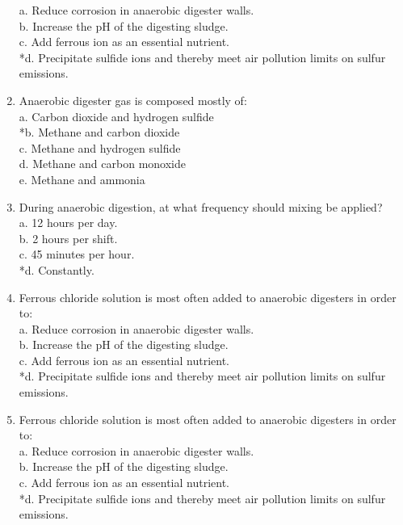\documentclass{article}
\begin{document}
\begin{enumerate}
a. Reduce corrosion in anaerobic digester walls. \\
b. Increase the pH of the digesting sludge. \\
c. Add ferrous ion as an essential nutrient. \\
*d. Precipitate sulfide ions and thereby meet air pollution limits on sulfur emissions. \\

\item  Anaerobic digester gas is composed mostly of: \\

a. Carbon dioxide and hydrogen sulfide \\
*b. Methane and carbon dioxide \\
c. Methane and hydrogen sulfide \\
d. Methane and carbon monoxide \\
e. Methane and ammonia \\

\item  During anaerobic digestion, at what frequency should mixing be applied? \\

a. 12 hours per day. \\
b. 2 hours per shift. \\
c. 45 minutes per hour. \\
*d. Constantly. \\

\item  Ferrous chloride solution is most often added to anaerobic digesters in order to: \\

a. Reduce corrosion in anaerobic digester walls. \\
b. Increase the pH of the digesting sludge. \\
c. Add ferrous ion as an essential nutrient. \\
*d. Precipitate sulfide ions and thereby meet air pollution limits on sulfur emissions. \\

\item  Ferrous chloride solution is most often added to anaerobic digesters in order to: \\

a. Reduce corrosion in anaerobic digester walls. \\
b. Increase the pH of the digesting sludge. \\
c. Add ferrous ion as an essential nutrient. \\
*d. Precipitate sulfide ions and thereby meet air pollution limits on sulfur emissions. \\


\end{enumerate}
\end{document}
